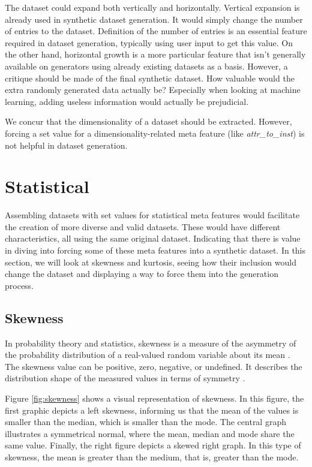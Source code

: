 The dataset could expand both vertically and horizontally. Vertical expansion is already used in synthetic dataset generation. It would simply change the number of entries to the dataset. Definition of the number of entries is an essential feature required in dataset generation, typically using user input to get this value. On the other hand, horizontal growth is a more particular feature that isn't generally available on generators using already existing datasets as a basis. However, a critique should be made of the final synthetic dataset. How valuable would the extra randomly generated data actually be? Especially when looking at machine learning, adding useless information would actually be prejudicial. 

We concur that the dimensionality of a dataset should be extracted. However, forcing a set value for a dimensionality-related meta feature (like \textit{attr\_to\_inst}) is not helpful in dataset generation.

\section{Statistical}
Assembling datasets with set values for statistical meta features would facilitate the creation of more diverse and valid datasets. These would have different characteristics, all using the same original dataset. Indicating that there is value in diving into forcing some of these meta features into a synthetic dataset. In this section, we will look at skewness and kurtosis, seeing how their inclusion would change the dataset and displaying a way to force them into the generation process.

\subsection{Skewness}
In probability theory and statistics, skewness is a measure of the asymmetry of the probability distribution of a real-valued random variable about its mean \citep{dean2018descriptive}. The skewness value can be positive, zero, negative, or undefined. It describes the distribution shape of the measured values in terms of symmetry \citep{rivolli2019characterizing}. 

Figure \ref{fig:skewness} shows a visual representation of skewness. In this figure, the first graphic depicts a left skewness, informing us that the mean of the values is smaller than the median, which is smaller than the mode. The central graph illustrates a symmetrical normal, where the mean, median and mode share the same value. Finally, the right figure depicts a skewed right graph. In this type of skewness, the mean is greater than the medium, that is, greater than the mode.

